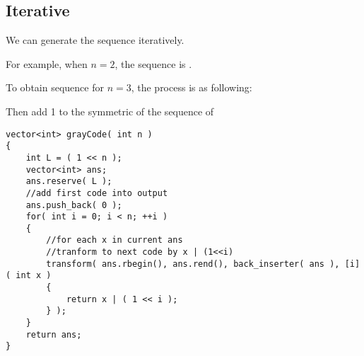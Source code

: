 \subsection{Iterative}
We can generate the sequence iteratively. 

For example, when $n=2$, the sequence is .

To obtain sequence for $n=3$, the process is as following:


Then add 1 to the symmetric of the sequence of 


\begin{lstlisting}[style=customc, caption={Iteratively Generating}]
vector<int> grayCode( int n )
{
    int L = ( 1 << n );
    vector<int> ans;
    ans.reserve( L );
    //add first code into output
    ans.push_back( 0 );
    for( int i = 0; i < n; ++i )
    {
        //for each x in current ans
        //tranform to next code by x | (1<<i)
        transform( ans.rbegin(), ans.rend(), back_inserter( ans ), [i]( int x )
        {
            return x | ( 1 << i );
        } );
    }
    return ans;
}
\end{lstlisting}